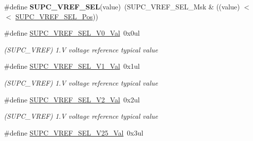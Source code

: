 \begin{DoxyCompactItemize}
\item 
\hypertarget{group___s_a_m_l21___s_u_p_c_ga206456b0b5f4f491db2e2723dd3f33ac}{}\#define {\bfseries S\+U\+P\+C\+\_\+\+V\+R\+E\+F\+\_\+\+S\+E\+L}(value)~(S\+U\+P\+C\+\_\+\+V\+R\+E\+F\+\_\+\+S\+E\+L\+\_\+\+Msk \& ((value) $<$$<$ \hyperlink{group___s_a_m_l21___s_u_p_c_gad4360a3a50810b54b6e54cc7685f7cf5}{S\+U\+P\+C\+\_\+\+V\+R\+E\+F\+\_\+\+S\+E\+L\+\_\+\+Pos}))\label{group___s_a_m_l21___s_u_p_c_ga206456b0b5f4f491db2e2723dd3f33ac}

\item 
\hypertarget{group___s_a_m_l21___s_u_p_c_ga0d57396e9b9b3f7ecb97e25581e7a00c}{}\#define \hyperlink{group___s_a_m_l21___s_u_p_c_ga0d57396e9b9b3f7ecb97e25581e7a00c}{S\+U\+P\+C\+\_\+\+V\+R\+E\+F\+\_\+\+S\+E\+L\+\_\+V0\+\_\+\+Val}~0x0ul\label{group___s_a_m_l21___s_u_p_c_ga0d57396e9b9b3f7ecb97e25581e7a00c}

\begin{DoxyCompactList}\small\item\em (S\+U\+P\+C\+\_\+\+V\+R\+E\+F) 1.\+V voltage reference typical value \end{DoxyCompactList}\item 
\hypertarget{group___s_a_m_l21___s_u_p_c_ga06478b9c3dd3f4382725fbb5c1642545}{}\#define \hyperlink{group___s_a_m_l21___s_u_p_c_ga06478b9c3dd3f4382725fbb5c1642545}{S\+U\+P\+C\+\_\+\+V\+R\+E\+F\+\_\+\+S\+E\+L\+\_\+V1\+\_\+\+Val}~0x1ul\label{group___s_a_m_l21___s_u_p_c_ga06478b9c3dd3f4382725fbb5c1642545}

\begin{DoxyCompactList}\small\item\em (S\+U\+P\+C\+\_\+\+V\+R\+E\+F) 1.\+V voltage reference typical value \end{DoxyCompactList}\item 
\hypertarget{group___s_a_m_l21___s_u_p_c_gaa85e43982e3779c28a68111dfc626364}{}\#define \hyperlink{group___s_a_m_l21___s_u_p_c_gaa85e43982e3779c28a68111dfc626364}{S\+U\+P\+C\+\_\+\+V\+R\+E\+F\+\_\+\+S\+E\+L\+\_\+V2\+\_\+\+Val}~0x2ul\label{group___s_a_m_l21___s_u_p_c_gaa85e43982e3779c28a68111dfc626364}

\begin{DoxyCompactList}\small\item\em (S\+U\+P\+C\+\_\+\+V\+R\+E\+F) 1.\+V voltage reference typical value \end{DoxyCompactList}\item 
\hypertarget{group___s_a_m_l21___s_u_p_c_gad21e79e28bf7d79cfd9ee92ba389b6b4}{}\#define \hyperlink{group___s_a_m_l21___s_u_p_c_gad21e79e28bf7d79cfd9ee92ba389b6b4}{S\+U\+P\+C\+\_\+\+V\+R\+E\+F\+\_\+\+S\+E\+L\+\_\+V25\+\_\+\+Val}~0x3ul\label{group___s_a_m_l21___s_u_p_c_gad21e79e28bf7d79cfd9ee92ba389b6b4}


\end{DoxyCompactItemize}
